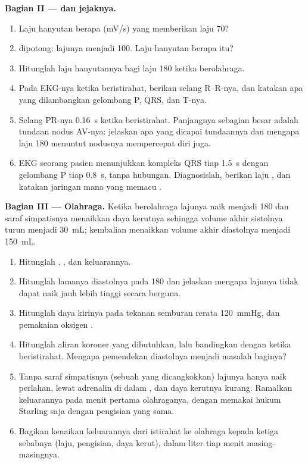 \begin{problem}
\medskip
\noindent\textbf{Bagian II ---  dan jejaknya.}
\begin{enumerate}[resume]
  \item Laju hanyutan berapa (\unit{mV/s}) yang memberikan laju 70?
  \item {} dipotong: lajunya menjadi 100. Laju hanyutan
        berapa itu?
  \item Hitunglah laju hanyutannya bagi laju 180 ketika berolahraga.
  \item Pada EKG-nya ketika beristirahat, berikan selang R--R-nya, dan
        katakan apa yang dilambangkan gelombang P, QRS, dan T-nya.
  \item Selang PR-nya \qty{0.16}{s} ketika beristirahat. Panjangnya
        sebagian besar adalah tundaan nodus AV-nya: jelaskan apa yang
        dicapai tundaannya dan mengapa laju 180 menuntut nodusnya
        mempercepat diri juga.
  \item EKG seorang pasien menunjukkan kompleks QRS tiap \qty{1.5}{s}
        dengan gelombang P tiap \qty{0.8}{s}, tanpa hubungan.
        Diagnosislah, berikan laju , dan katakan jaringan mana
        yang memacu .
\end{enumerate}

\medskip
\noindent\textbf{Bagian III --- Olahraga.}
Ketika berolahraga lajunya naik menjadi 180 dan saraf simpatisnya
menaikkan daya kerutnya sehingga volume akhir sistolnya turun menjadi
\qty{30}{mL}; kembalian  menaikkan volume akhir diastolnya
menjadi \qty{150}{mL}.
\begin{enumerate}[resume]
  \item Hitunglah , , dan
        keluarannya.
  \item Hitunglah lamanya diastolnya pada 180 dan jelaskan mengapa
        lajunya tidak dapat naik jauh lebih tinggi secara berguna.
  \item Hitunglah daya  kirinya pada tekanan semburan rerata
        \qty{120}{mmHg}, dan pemakaian oksigen .
  \item Hitunglah aliran koroner yang dibutuhkan, lalu bandingkan
        dengan ketika beristirahat. Mengapa pemendekan diastolnya
        menjadi masalah baginya?
  \item Tanpa saraf simpatisnya (sebuah  yang dicangkokkan)
        lajunya hanya naik perlahan, lewat adrenalin di dalam
        , dan daya kerutnya kurang. Ramalkan keluarannya pada
        menit pertama olahraganya, dengan memakai hukum Starling saja
        dengan pengisian yang sama.
  \item Bagikan kenaikan keluarannya dari istirahat ke olahraga kepada
        ketiga sebabnya (laju, pengisian, daya kerut), dalam liter
        tiap menit masing-masingnya.
\end{enumerate}


\end{problem}
